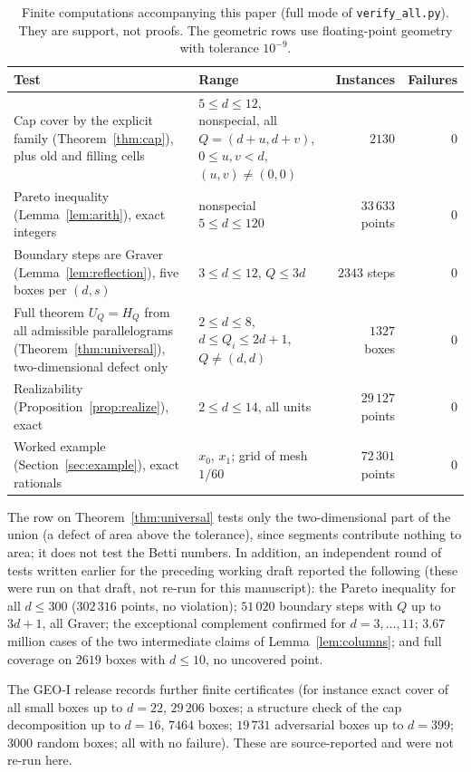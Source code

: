 \begin{table}[ht]
\centering\small
\begin{tabular}{@{}p{5.2cm}p{4.3cm}rr@{}}
\toprule
Test & Range & Instances & Failures\\
\midrule
Cap cover by the explicit family (Theorem~\ref{thm:cap}), plus old and filling cells & $5\le d\le12$, nonspecial, all $Q=(d+u,d+v)$, $0\le u,v<d$, $(u,v)\neq(0,0)$ & $2130$ & $0$\\
Pareto inequality (Lemma~\ref{lem:arith}), exact integers & nonspecial $5\le d\le120$ & $33\,633$ points & $0$\\
Boundary steps are Graver (Lemma~\ref{lem:reflection}), five boxes per $(d,s)$ & $3\le d\le12$, $Q\le3d$ & $2343$ steps & $0$\\
Full theorem $U_Q=H_Q$ from all admissible parallelograms (Theorem~\ref{thm:universal}), two-dimensional defect only & $2\le d\le8$, $d\le Q_i\le2d+1$, $Q\ne(d,d)$ & $1327$ boxes & $0$\\
Realizability (Proposition~\ref{prop:realize}), exact & $2\le d\le14$, all units & $29\,127$ points & $0$\\
Worked example (Section~\ref{sec:example}), exact rationals & $x_0$, $x_1$; grid of mesh $1/60$ & $72\,301$ points & $0$\\
\bottomrule
\end{tabular}
\caption{Finite computations accompanying this paper (full mode of \texttt{verify\_all.py}). They are support, not proofs. The geometric rows use floating-point geometry with tolerance $10^{-9}$.}\label{tab:checks}
\end{table}

The row on Theorem~\ref{thm:universal} tests only the two-dimensional part of the union (a defect of area above the tolerance), since segments contribute nothing to area; it does not test the Betti numbers. In addition, an independent round of tests written earlier for the preceding working draft reported the following (these were run on that draft, not re-run for this manuscript): the Pareto inequality for all $d\le300$ ($302\,316$ points, no violation); $51\,020$ boundary steps with $Q$ up to $3d+1$, all Graver; the exceptional complement confirmed for $d=3,\dots,11$; $3.67$ million cases of the two intermediate claims of Lemma~\ref{lem:columns}; and full coverage on $2619$ boxes with $d\le10$, no uncovered point.

The GEO-I release records further finite certificates (for instance exact cover of all small boxes up to $d=22$, $29\,206$ boxes; a structure check of the cap decomposition up to $d=16$, $7464$ boxes; $19\,731$ adversarial boxes up to $d=399$; $3000$ random boxes; all with no failure). These are source-reported and were not re-run here.

